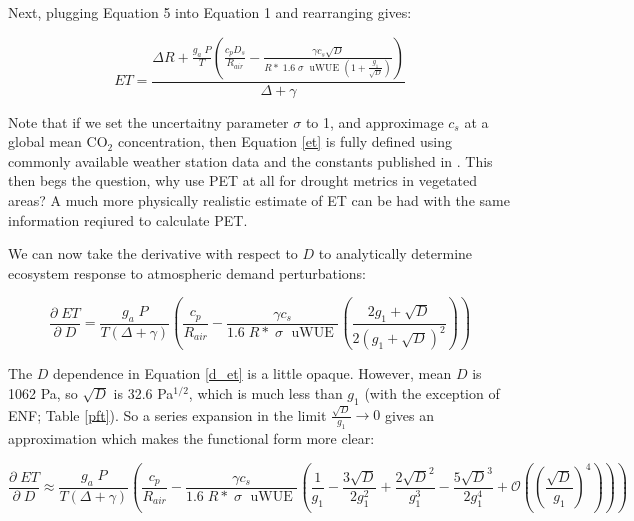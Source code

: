 \documentclass[draft,linenumbers]{agujournal}
\begin{document}
Next, plugging Equation 5 into Equation 1 and rearranging gives:

\begin{linenomath*}
  \begin{equation}
    ET = \frac{\Delta R + \frac{g_a\; P}{T} \left( \frac{ c_p D_{s}}{R_{air}} -  \frac{\gamma c_s \sqrt{D} }{ R* \; 1.6\; \sigma\; \text{ uWUE } (1 + \frac{g_1}{\sqrt{D}})} \right) }{ \Delta + \gamma}
    \label{et}
  \end{equation}
\end{linenomath*}

Note that if we set the uncertaitny parameter $\sigma$ to 1, and approximage $c_s$ at a global mean CO$_2$ concentration, then Equation \ref{et} is fully defined using commonly available weather station data and the constants published in \citet{Zhou_2015, Lin_2015}. This then begs the question, why use PET at all for drought metrics in vegetated areas? A much more physically realistic estimate of ET can be had with the same information reqiured to calculate PET. 

We can now take the derivative with respect to $D$ to analytically determine ecosystem response to atmospheric demand perturbations:

\begin{linenomath*}
  \begin{equation}
    \frac{\partial \;  ET}{\partial \; D} = \frac{g_a \; P}{T(\Delta + \gamma)}   \left(\frac{ c_p}{R_{air}} -  \frac{\gamma c_s }{1.6 \; R*\; \sigma \; \text{ uWUE }} \left( \frac{2 g_1 + \sqrt{D}}{2 (g_1 + \sqrt{D})^2}\right) \right)
    \label{d_et}
  \end{equation}
\end{linenomath*}

The $D$ dependence in Equation \ref{d_et} is a little opaque. However, mean $D$ is 1062 Pa, so $\sqrt{D}$ is 32.6 Pa$^{1/2}$, which is much less than $g_1$ (with the exception of ENF; Table \ref{pft}). So a series expansion in the limit $\frac{\sqrt{D}}{g_1} \to 0$ gives an approximation which makes the functional form more clear:

\begin{linenomath*}
  \begin{equation}
    \frac{\partial \;  ET}{\partial \; D} \approx \frac{g_a \; P}{T(\Delta + \gamma)}   \left(\frac{ c_p}{R_{air}} -  \frac{\gamma c_s }{1.6 \; R*\; \sigma \; \text{ uWUE }} \left( \frac{1}{g_{1}} - \frac{3 \sqrt{D}}{2 g_{1}^{2}} + \frac{2 \sqrt{D}^{2}}{g_{1}^{3}} - \frac{5 \sqrt{D}^{3}}{2 g_{1}^{4}} + \mathcal{O}\left(\left(\frac{\sqrt{D}}{g_1}\right)^{4}\right) \right) \right)
    \label{d_et_approx}
  \end{equation}
\end{linenomath*}
\end{document}
